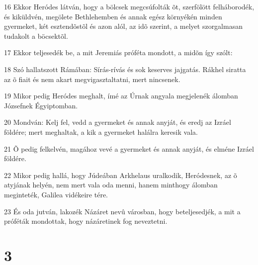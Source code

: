 \par 16 Ekkor Heródes látván, hogy a bölcsek megcsúfolták õt, szerfölött felháborodék, és kiküldvén, megölete Bethlehemben és annak egész környékén minden gyermeket, két esztendõstõl és azon alól, az idõ szerint, a melyet szorgalmasan tudakolt a böcsektõl.
\par 17 Ekkor teljesedék be, a mit Jeremiás próféta mondott, a midõn így szólt:
\par 18 Szó hallatszott Rámában: Sírás-rívás és sok keserves jajgatás. Rákhel siratta az õ fiait és nem akart megvigasztaltatni, mert nincsenek.
\par 19 Mikor pedig Heródes meghalt, ímé az Úrnak angyala megjelenék álomban Józsefnek Égyiptomban.
\par 20 Mondván: Kelj fel, vedd a gyermeket és annak anyját, és eredj az Izráel földére; mert meghaltak, a kik a gyermeket halálra keresik vala.
\par 21 Õ pedig felkelvén, magához vevé a gyermeket és annak anyját, és elméne Izráel földére.
\par 22 Mikor pedig hallá, hogy Júdeában Arkhelaus uralkodik, Heródesnek, az õ atyjának helyén, nem mert vala oda menni, hanem minthogy álomban meginteték, Galilea vidékeire tére.
\par 23 És oda jutván, lakozék Názáret nevû városban, hogy beteljesedjék, a mit a próféták mondottak,  hogy názáretinek fog neveztetni.

\chapter{3}

